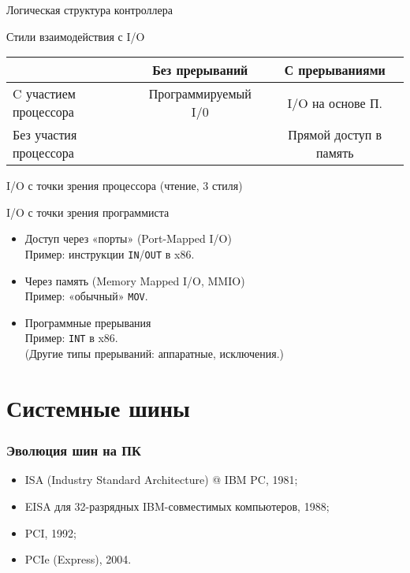 \begin{frame}{Логическая структура контроллера}
\end{frame}

\begin{frame}{Стили взаимодействия с I/O}
\begin{center}
\renewcommand{\arraystretch}{1.6}
\begin{tabular}{>{\raggedright}p{2cm}|cc}
                       & Без прерываний & С прерываниями  \\ \hline
C участием процессора & Программируемый I/0 & I/O на основе П. \\
Без участия процессора & & Прямой доступ в память\\
\end{tabular}
\end{center}
\end{frame}

\begin{frame}[plain]{I/O с точки зрения процессора (чтение, 3 стиля)}
\vspace{-.2cm}
\end{frame}

\begin{frame}{I/O с точки зрения программиста}

\pause
\begin{itemize}[<+->]\itemsep=.7cm
    \item Доступ через «порты» (Port-Mapped I/O)\\Пример: инструкции \texttt{IN}/\texttt{OUT} в x86.

    \item Через память (Memory Mapped I/O, MMIO)\\
    Пример: «обычный» \texttt{MOV}.

    \item Программные прерывания\\
    Пример: \texttt{INT} в x86. \\ \pause (Другие типы прерываний: аппаратные, исключения.)
\end{itemize}
\end{frame}

\section{Системные шины}

\begin{frame}
\frametitle{Эволюция шин на ПК}
\begin{itemize}\itemsep=.6cm
    \item ISA (Industry Standard Architecture) @ IBM PC, 1981;
    \item EISA для 32-разрядных IBM-совместимых компьютеров, 1988;
    \item PCI, 1992;
    \item PCIe (Express), 2004.
\end{itemize}
\end{frame}

